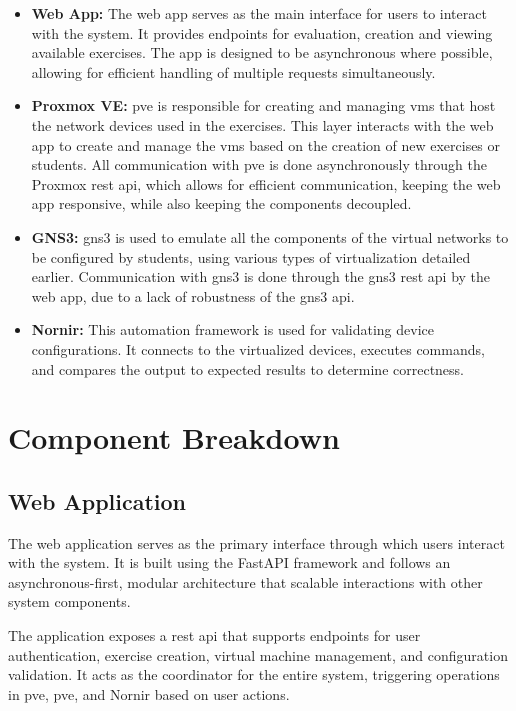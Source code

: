 \begin{itemize}
    \item \textbf{Web App:} The web app serves as the main interface for users to interact with the system. It provides 
    endpoints for evaluation, creation  and viewing available exercises. The app is designed to be asynchronous where possible, 
    allowing for efficient handling of multiple requests simultaneously.
    
    \item \textbf{Proxmox VE:} \ac{pve} is responsible for creating and managing \ac{vm}s that host the network devices used in 
    the exercises. This layer interacts with the web app to create and manage the \ac{vm}s based on the creation of new 
    exercises or students. All communication with \ac{pve} is done asynchronously through the Proxmox \ac{rest} \ac{api}, 
    which allows for efficient communication, keeping the web app responsive, while also keeping the components decoupled. 
    
    \item \textbf{GNS3:} \ac{gns3} is used to emulate all the components of the virtual networks to be configured by students, 
    using various types of virtualization detailed earlier. Communication with \ac{gns3} is done through the \ac{gns3} 
    \ac{rest} \ac{api}  by the web app, due to a lack of robustness of the \ac{gns3} \ac{api}.

    \item \textbf{Nornir:} This automation framework is used for validating device configurations. It connects to the 
    virtualized devices, executes commands, and compares the output to expected results to determine correctness.
\end{itemize}

\section{Component Breakdown}

\subsection{Web Application}
The web application serves as the primary interface through which users interact with the system. It is built using the FastAPI 
framework and follows an asynchronous-first, modular architecture that scalable interactions with other system components.

The application exposes a \ac{rest} \ac{api} that supports endpoints for user authentication, exercise creation, virtual 
machine management, and configuration validation. It acts as the coordinator for the entire system, triggering operations in 
\ac{pve}, \ac{pve}, and Nornir based on user actions.

